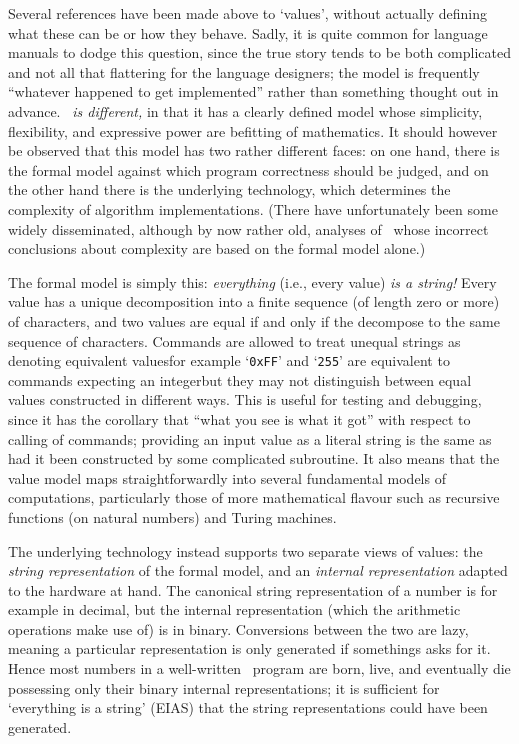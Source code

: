 \documentclass{mtmtcl}
\theoremstyle{plain}
\theoremstyle{remark}
\begin{document}
Several references have been made above to `values', without actually 
defining what these can be or how they behave. Sadly, it is quite 
common for language manuals to dodge this question, since the true 
story tends to be both complicated and not all that flattering for 
the language designers; the model is frequently ``whatever happened 
to get implemented'' rather than something thought out in advance. 
\emph{\Tcl\ is different,} in that it has a clearly defined model 
whose simplicity, flexibility, and expressive power are befitting of 
mathematics. It should however be observed that this model has two 
rather different faces: on one hand, there is the formal model 
against which program correctness should be judged, and on the other 
hand there is the underlying technology, which determines the 
complexity of algorithm implementations. (There have unfortunately 
been some widely disseminated, although by now rather old, analyses 
of \Tcl\ whose incorrect conclusions about complexity are based on 
the formal model alone.)

The formal model is simply this: \emph{everything} (i.e., every 
value) \emph{is a string!} Every value has a unique decomposition 
into a finite sequence (of length zero or more) of characters, and 
two values are equal if and only if the decompose to the same 
sequence of characters. Commands are allowed to treat unequal 
strings as denoting equivalent values\Ldash for example 
`\texttt{0xFF}' and `\texttt{255}' are equivalent to commands 
expecting an integer\Rdash but they may not distinguish between equal 
values constructed in different ways. This is useful for testing and 
debugging, since it has the corollary that ``what you see is what it 
got'' with respect to calling of commands; providing an input value 
as a literal string is the same as had it been constructed by some 
complicated subroutine. It also means that the value model maps 
straightforwardly into several fundamental models of computations, 
particularly those of more mathematical flavour such as 
recursive functions (on natural numbers) and Turing machines.

The underlying technology instead supports two separate views of 
values: the \emph{string representation} of the formal model, and an 
\emph{internal representation} adapted to the hardware at hand. The 
canonical string representation of a number is for example in 
decimal, but the internal representation (which the arithmetic 
operations make use of) is in binary. Conversions between the two are 
lazy, meaning a particular representation is only generated if 
somethings asks for it. Hence most numbers in a well-written \Tcl\ 
program are born, live, and eventually die possessing only their 
binary internal representations; it is sufficient for `everything is 
a string' (EIAS) that the string representations could have been 
generated.
\end{document}
